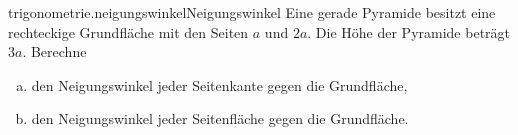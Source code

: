 \begin{exercise}{trigonometrie.neigungswinkel}{Neigungswinkel}
  \ifproblem\problem
    Eine gerade Pyramide besitzt eine rechteckige Grundfläche mit
    den Seiten $a$ und $2a$. Die Höhe der Pyramide beträgt $3a$.
    Berechne
    \begin{enumerate}[a)]
      \item den Neigungswinkel jeder Seitenkante gegen die Grundfläche,
      \item den Neigungswinkel jeder Seitenfläche gegen die Grundfläche.
    \end{enumerate}
  \fi
\end{exercise}
